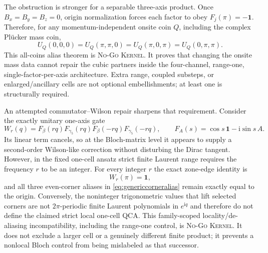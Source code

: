 \documentclass[11pt]{article}
\newcommand{\Kernel}{\textcolor{kernelcolor}{\textsc{Kernel}}}
\newcommand{\NoGo}{\textsc{No-Go}}
\newcommand{\ii}{\mathrm{i}}
\newcommand{\id}{\mathbf{1}}
\begin{document}
The obstruction is stronger for a separable three-axis product.  Once
$B_x=B_y=B_z=0$, origin normalization forces each factor to obey
$F_j(\pi)=-\id$.  Therefore, for any momentum-independent onsite coin $Q$,
including the complex Pl\"ucker mass coin,
\begin{equation}\label{eq:genericcorneralias}
 U_Q(0,0,0)=U_Q(\pi,\pi,0)=U_Q(\pi,0,\pi)=U_Q(0,\pi,\pi).
\end{equation}
This all-coins alias theorem is \NoGo{} \Kernel{}.  It proves that changing
the onsite mass data cannot repair the cubic partners inside the
four-channel, range-one, single-factor-per-axis architecture.  Extra range,
coupled substeps, or enlarged/ancillary cells are not optional embellishments;
at least one is structurally required.

An attempted commutator--Wilson repair sharpens that requirement.  Consider
the exactly unitary one-axis gate
\begin{equation}
 W_r(q)=F_{\beta}(rq)F_{\gamma_5}(rq)
        F_{\beta}(-rq)F_{\gamma_5}(-rq),
 \qquad
 F_A(s)=\cos s\,\id-\ii\sin s\,A.
\end{equation}
Its linear term cancels, so at the Bloch-matrix level it appears to supply a
second-order Wilson-like correction without disturbing the Dirac tangent.
However, in the fixed one-cell ansatz strict finite Laurent range requires the
frequency $r$ to be an integer.  For every integer $r$ the exact zone-edge
identity is
\begin{equation}
 W_r(\pi)=\id,
\end{equation}
and all three even-corner aliases in \eqref{eq:genericcorneralias} remain
exactly equal to the origin.  Conversely, the noninteger trigonometric values
that lift selected corners are not $2\pi$-periodic finite Laurent polynomials
in $e^{\ii q}$ and therefore do not define the claimed strict local one-cell
QCA.  This family-scoped locality/de-aliasing incompatibility, including the
range-one control, is \NoGo{} \Kernel{}.  It does not exclude a larger cell or
a genuinely different finite product; it prevents a nonlocal Bloch control
from being mislabeled as that successor.
\end{document}
